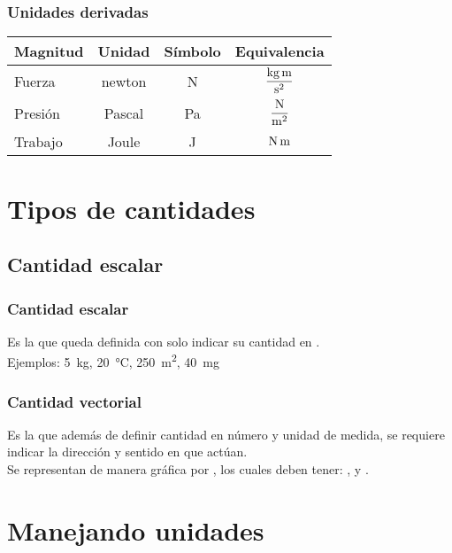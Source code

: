 \documentclass[14pt]{beamer}
\begin{document}
\begin{frame}
\frametitle{Unidades derivadas}
\begin{table}
\renewcommand{\arraystretch}{1.4}
\centering
\begin{tabular}{l | c | c | c}
Magnitud & Unidad & Símbolo & Equivalencia\\ \hline 
Fuerza & newton & \unit{\newton} & $\displaystyle \unit[per-mode=fraction]{\kilo\gram\meter\per\square\second} $\\ \hline \pause
Presión & Pascal & \unit{\pascal} & $\displaystyle \unit[per-mode=fraction]{\newton\per\square\meter}$ \\ \hline \pause
Trabajo & Joule & \unit{\joule} & $\displaystyle \unit[per-mode=fraction]{\newton\meter}$ \\ \hline
\end{tabular}
\end{table}
\end{frame}

\section{Tipos de cantidades}
\subsection{Cantidad escalar}

\begin{frame}
\frametitle{Cantidad escalar}
Es la que queda definida con solo indicar su cantidad en .
\\
\bigskip
\pause
Ejemplos: \SI{5}{\kilo\gram}, \pause \SI{20}{\degreeCelsius}, \pause \SI{250}{\square\meter}, \pause \SI{40}{\milli\gram}
\end{frame}
\begin{frame}
\frametitle{Cantidad vectorial}
Es la que además de definir cantidad en número y unidad de medida, se requiere indicar la dirección y sentido en que actúan.
\\
\bigskip
\pause
Se representan de manera gráfica por , \pause los cuales deben tener: , \pause {} \pause y .
\end{frame}

\section{Manejando unidades}
\end{document}

